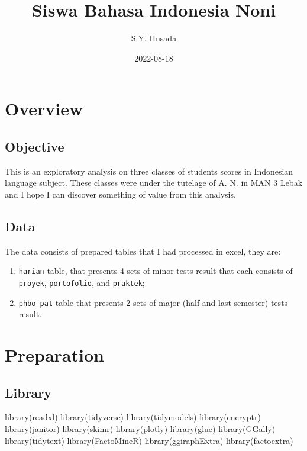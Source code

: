 \documentclass[
]{article}
\title{Siswa Bahasa Indonesia Noni}
\author{S.Y. Husada}
\date{2022-08-18}
\newenvironment{Shaded}{\begin{snugshade}}{\end{snugshade}}
\newcommand{\FunctionTok}[1]{\textcolor[rgb]{0.00,0.00,0.00}{#1}}
\newcommand{\NormalTok}[1]{#1}
\begin{document}
\maketitle

\hypertarget{overview}{%
\section{Overview}\label{overview}}

\hypertarget{objective}{%
\subsection{Objective}\label{objective}}

This is an exploratory analysis on three classes of students scores in
Indonesian language subject. These classes were under the tutelage of A.
N. in MAN 3 Lebak and I hope I can discover something of value from this
analysis.

\hypertarget{data}{%
\subsection{Data}\label{data}}

The data consists of prepared tables that I had processed in excel, they
are:

\begin{enumerate}
\def\labelenumi{\arabic{enumi}.}
\item
  \texttt{harian} table, that presents 4 sets of minor tests result that
  each consists of \texttt{proyek}, \texttt{portofolio}, and
  \texttt{praktek};
\item
  \texttt{phbo\ pat} table that presents 2 sets of major (half and last
  semester) tests result.
\end{enumerate}

\hypertarget{preparation}{%
\section{Preparation}\label{preparation}}

\hypertarget{library}{%
\subsection{Library}\label{library}}

\begin{Shaded}
\begin{Highlighting}[]
\FunctionTok{library}\NormalTok{(readxl)}
\FunctionTok{library}\NormalTok{(tidyverse)}
\FunctionTok{library}\NormalTok{(tidymodels)}
\FunctionTok{library}\NormalTok{(encryptr)}
\FunctionTok{library}\NormalTok{(janitor)}
\FunctionTok{library}\NormalTok{(skimr)}
\FunctionTok{library}\NormalTok{(plotly)}
\FunctionTok{library}\NormalTok{(glue)}
\FunctionTok{library}\NormalTok{(GGally)}
\FunctionTok{library}\NormalTok{(tidytext)}
\FunctionTok{library}\NormalTok{(FactoMineR)}
\FunctionTok{library}\NormalTok{(ggiraphExtra)}
\FunctionTok{library}\NormalTok{(factoextra)}
\end{Highlighting}
\end{Shaded}
\end{document}

